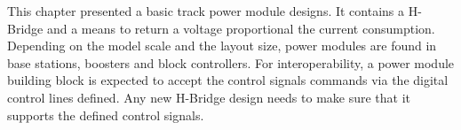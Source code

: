 
This chapter presented a basic track power module designs. It contains a H-Bridge and a means to return a voltage proportional the current consumption. Depending on the model scale and the layout size, power modules are found in base stations, boosters and block controllers. For interoperability, a power module building block is expected to accept the control signals commands via the digital control lines defined. Any new H-Bridge design needs to make sure that it supports the defined control signals.

